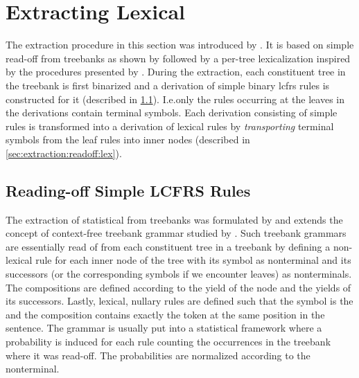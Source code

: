 \documentclass[../../document.tex]{subfiles}
\begin{document}
    \section{Extracting Lexical } \label{sec:extraction:readoff}
    The extraction procedure in this section was introduced by \citet{RupMoe21}.
    It is based on simple  read-off from treebanks as shown by \citet{KalMai13} followed by a per-tree lexicalization inspired by the procedures presented by \citet{EngMalMan18, MoeRup20}.
    During the extraction, each constituent tree in the treebank is first binarized and a derivation of simple binary lcfrs rules is constructed for it (described in \cref{sec:extraction:readoff:simple}).
    I.e.\@ only the rules occurring at the leaves in the derivations contain terminal symbols.
    Each derivation consisting of simple  rules is transformed into a derivation of lexical rules by \emph{transporting} terminal symbols from the leaf rules into inner nodes (described in \cref{sec:extraction:readoff:lex}).

    \subsection{Reading-off Simple LCFRS Rules}\label{sec:extraction:readoff:simple}
    The extraction of statistical  from treebanks was formulated by \citet{MaierSogaard08} and extends the concept of context-free treebank grammar studied by \citet{Cha96}.
    Such treebank grammars are essentially read of from each constituent tree in a treebank by defining a non-lexical rule for each inner node of the tree with its symbol as  nonterminal and its successors (or the corresponding  symbols if we encounter leaves) as  nonterminals.
    The compositions are defined according to the yield of the node and the yields of its successors.
    Lastly, lexical, nullary rules are defined such that the  symbol is the  and the composition contains exactly the token at the same position in the sentence.
    The grammar is usually put into a statistical framework where a probability is induced for each rule counting the occurrences in the treebank where it was read-off.
    The probabilities are normalized according to the  nonterminal.
\end{document}
